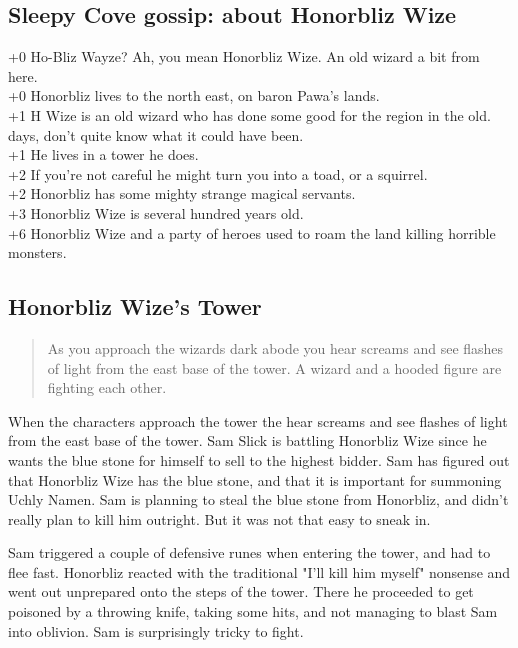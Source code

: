 \documentclass[11pt, twoside, titlepage, a4paper]{report}
\newenvironment{readoutloud}%
{\begin{quote}\begin{itshape}}%
{\end{itshape}\end{quote}}%
\begin{document}
\subsection*{Sleepy Cove gossip: about Honorbliz Wize}
+0 Ho-Bliz Wayze? Ah, you mean Honorbliz Wize. An old wizard a bit from here. \\
+0 Honorbliz lives to the north east, on baron Pawa's lands. \\
+1 H Wize is an old wizard who has done some good for the region in the old. \\ days, don't quite know what it could have been. \\
+1 He lives in a tower he does. \\
+2 If you're not careful he might turn you into a toad, or a squirrel. \\
+2 Honorbliz has some mighty strange magical servants. \\
+3 Honorbliz Wize is several hundred years old. \\
+6 Honorbliz Wize and a party of heroes used to roam the land killing horrible monsters. \\


\subsection*{Honorbliz Wize's Tower}
\begin{readoutloud}
As you approach the wizards dark abode you hear screams and see flashes of light from the east base of the tower. A wizard and a hooded figure are fighting each other.
\end{readoutloud}

When the characters approach the tower the hear screams and see flashes of light from the east base of the tower. Sam Slick is battling Honorbliz Wize since he wants the blue stone for himself to sell to the highest bidder. Sam has figured out that Honorbliz Wize has the blue stone, and that it is important for summoning Uchly Namen. Sam is planning to steal the blue stone from Honorbliz, and didn't really plan to kill him outright. But it was not that easy to sneak in.

Sam triggered a couple of defensive runes when entering the tower, and had to flee fast. Honorbliz reacted with the traditional "I'll kill him myself" nonsense and went out unprepared onto the steps of the tower. There he proceeded to get poisoned by a throwing knife, taking some hits, and not managing to blast Sam into oblivion. Sam is surprisingly tricky to fight.
\end{document}
